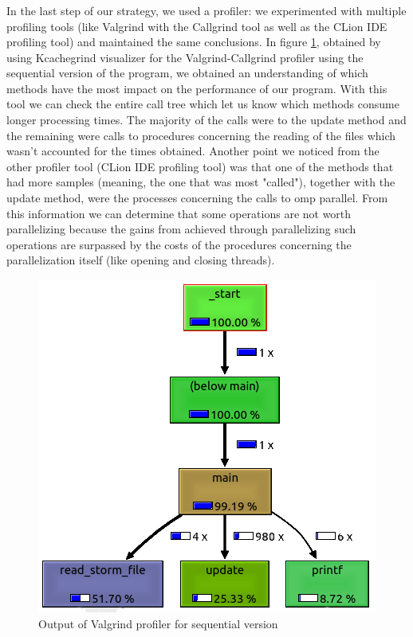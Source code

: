\documentclass[10pt,journal,compsoc]{IEEEtran}
\begin{document}
\subsubsection{}
In the last step of our strategy, we used a profiler: we experimented with multiple profiling tools (like Valgrind with the Callgrind tool as well as the CLion IDE profiling tool) and maintained the same conclusions. In figure \ref{profiler-pic}, obtained by using Kcachegrind visualizer for the Valgrind-Callgrind profiler using the sequential version of the program, we obtained an understanding of which methods have the most impact on the performance of our program. With this tool we can check the entire call tree which let us know which methods consume longer processing times. The majority of the calls were to the update method and the remaining were calls to procedures concerning the reading of the files which wasn't accounted for the times obtained. 
Another point we noticed from the other profiler tool (CLion IDE profiling tool) was that one of the methods that had more samples (meaning, the one that was most "called"), together with the update method, were the processes concerning the calls to omp parallel. From this information we can determine that some operations are not worth parallelizing because the gains from achieved through parallelizing such operations are surpassed by the costs of the procedures concerning the parallelization itself (like opening and closing threads).

\begin{figure}[h]
\centering
\includegraphics[scale=0.5]{../../profile_Valgrind.png}
\caption{Output of Valgrind profiler for sequential version}
\label{profiler-pic}
\end{figure}
\end{document}

